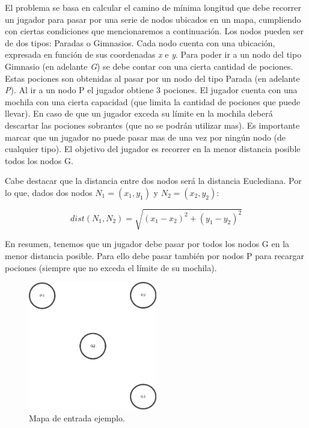 \par El problema se basa en calcular el camino de mínima longitud que debe recorrer un jugador para pasar por una serie de nodos ubicados en un mapa, cumpliendo con ciertas condiciones que mencionaremos a continuación. Los nodos pueden ser de dos tipos: Paradas o Gimnasios. Cada nodo cuenta con una ubicación, expresada en función de sus coordenadas \textit{x} e \textit{y}. Para poder ir a un nodo del tipo Gimnasio (en adelante \textit{G}) se debe contar con una cierta cantidad de pociones. Estas pociones son obtenidas al pasar por un nodo del tipo Parada (en adelante \textit{P}). Al ir a un nodo P el jugador obtiene 3 pociones. El jugador cuenta con una mochila con una cierta capacidad (que limita la cantidad de pociones que puede llevar). En caso de que un jugador exceda su límite en la mochila deberá descartar las pociones sobrantes (que no se podrán utilizar mas). Es importante marcar que un jugador no puede pasar mas de una vez por ningún nodo (de cualquier tipo). El objetivo del jugador es recorrer en la menor distancia posible todos los nodos G.

\par Cabe destacar que la distancia entre dos nodos será la distancia Euclediana. Por lo que, dados dos nodos $N_1 = (x_1, y_1)$ y $N_2 = (x_2, y_2)$:

\begin{equation}
	dist(N_1, N_2) = \sqrt{ (x_1 - x_2)^2 + (y_1 - y_2)^2}
\end{equation}

\par En resumen, tenemos que un jugador debe pasar por todos los nodos G en la menor distancia posible. Para ello debe pasar también por nodos P para recargar pociones (siempre que no exceda el límite de su mochila).

\begin{figure}[h]
	\begin{center}
		\includegraphics[width=0.5\textwidth]{img/descripcion/descripcion_ejemplo_entrada.png}
		\caption{Mapa de entrada ejemplo.}
		\label{fig: descripcion_ejemplo_entrada}
	\end{center}
\end{figure}

